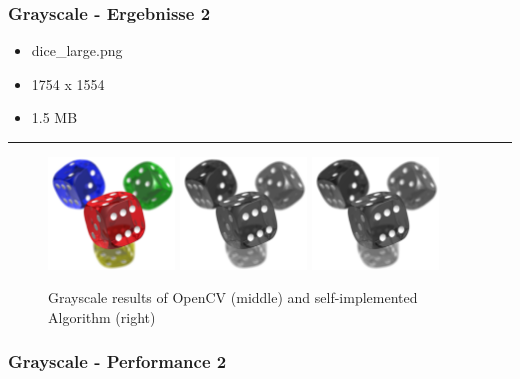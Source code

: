 \begin{frame}
    \frametitle{Grayscale - Ergebnisse 2}

    \begin{itemize}
        \item dice\_large.png
        \item 1754 x 1554
        \item 1.5 MB
    \end{itemize}

    \hfill
    \hrule
    \hfill

    \begin{figure}[H]
        \centering
    
        \includegraphics[width=0.30\textwidth]{images/dice_large.png}
        \includegraphics[width=0.30\textwidth]{images/results/grayscale-cv.dice_large.png}
        \includegraphics[width=0.30\textwidth]{images/results/grayscale-my.dice_large.png}

        
        \begin{center}
            \caption{Grayscale results of OpenCV (middle) and self-implemented  Algorithm (right)}            
        \end{center}

        \label{fig:grayscale2}
    \end{figure}
\end{frame}

\begin{frame}
    \frametitle{Grayscale - Performance 2}

    

\end{frame}

